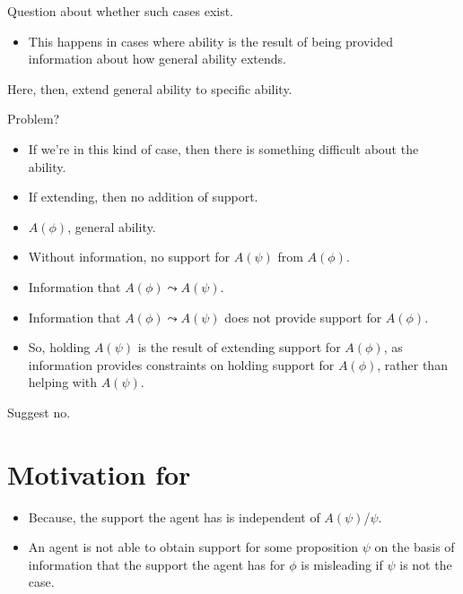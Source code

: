 \documentclass[10pt]{article}
\begin{document}
Question about whether such cases exist.

\begin{itemize}
\item This happens in cases where ability is the result of being provided information about how general ability extends.
\end{itemize}

Here, then, extend general ability to specific ability.

Problem?

\begin{itemize}
\item If we're in this kind of case, then there is something difficult about the ability.
\end{itemize}

\begin{itemize}
\item If extending, then no addition of support.
\end{itemize}

\begin{itemize}
\item \(A(\phi)\), general ability.
\item Without information, no support for \(A(\psi)\) from \(A(\phi)\).
\item Information that \(A(\phi) \leadsto A(\psi)\).
\item Information that \(A(\phi) \leadsto A(\psi)\) does not provide support for \(A(\phi)\).
\item So, holding \(A(\psi)\) is the result of extending support for \(A(\phi)\), as information provides constraints on holding support for \(A(\phi)\), rather than helping with \(A(\psi)\).
\end{itemize}


Suggest no.

\section{Motivation for \nI{}}
\label{sec:motivation-ni}

\begin{itemize}
\item Because, the support the agent has is independent of \(A(\psi)\)/\(\psi\).
\end{itemize}

\begin{itemize}
\item An agent is not able to obtain support for some proposition \(\psi\) on the basis of information that the support the agent has for \(\phi\) is misleading if \(\psi\) is not the case.
\end{itemize}
\end{document}
